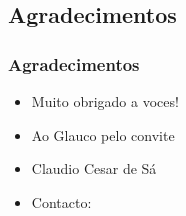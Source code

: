 \subsection{Agradecimentos}
\begin{frame}[fragile]

    \frametitle{Agradecimentos}

    \begin{itemize}
      \item Muito obrigado a voces!
      \pause
        \item  Ao Glauco pelo convite
        
      \pause
      \item Claudio Cesar de Sá
     \item Contacto: 


    \end{itemize}
\end{frame}



